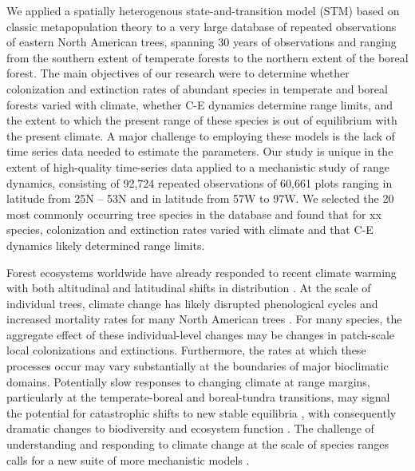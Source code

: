 \documentclass[11pt]{article}
\begin{document}
We applied a spatially heterogenous state-and-transition model (STM) based on classic metapopulation theory \cite{Levins1969, Holt2000} to a very large database of repeated observations of eastern North American trees, spanning 30 years of observations and ranging from the southern extent of temperate forests to the northern extent of the boreal forest.
The main objectives of our research were to determine whether colonization and extinction rates of abundant species in temperate and boreal forests varied with climate, whether C-E dynamics determine range limits, and the extent to which the present range of these species is out of equilibrium with the present climate.
A major challenge to employing these models is the lack of time series data needed to estimate the parameters.
Our study is unique in the extent of high-quality time-series data applied to a mechanistic study of range dynamics, consisting of 92,724 repeated observations of 60,661 plots ranging in latitude from 25\degree N -- 53\degree N and in latitude from 57\degree W to 97\degree W. 
We selected the 20 most commonly occurring tree species in the database and found that for xx species, colonization and extinction rates varied with climate and that C-E dynamics likely determined range limits.

Forest ecosystems worldwide have already responded to recent climate warming with both altitudinal and latitudinal shifts in distribution \cite{Parmesan2006, Beckage2008, Lenoir2008, Rosenzweig2008}.
At the scale of individual trees, climate change has likely disrupted phenological cycles and increased mortality rates for many North American trees \cite{Chuine2001, vanMantgem2009, Menzel2006}.
For many species, the aggregate effect of these individual-level changes may be changes in patch-scale local colonizations and extinctions.
Furthermore, the rates at which these processes occur may vary substantially at the boundaries of major bioclimatic domains.
Potentially slow responses to changing climate at range margins, particularly at the temperate-boreal and boreal-tundra transitions, may signal the potential for catastrophic shifts to new stable equilibria \cite{Scheffer2009,Scheffer2013}, with consequently dramatic changes to biodiversity and ecosystem function \cite{Hooper2005}.
The challenge of understanding and responding to climate change at the scale of species ranges calls for a new suite of more mechanistic models \cite{Yackulic2015}.
\end{document}
